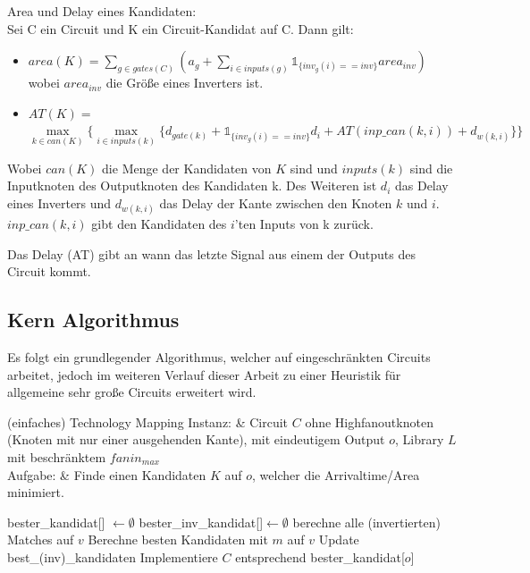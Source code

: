 \documentclass[11pt, a4paper, german]{article}
\begin{document}
\begin{definition}{Area und Delay eines Kandidaten:}\\
Sei C ein Circuit und K ein Circuit-Kandidat auf C. Dann gilt: \\
\begin{itemize}
\item $area(K) = \sum_{g \in gates(C)} (a_g + \sum_{i \in inputs(g)} \mathbb{1}_{\{inv_g(i)==inv\}} area_{inv})$ \\
wobei $area_{inv}$ die Größe eines Inverters ist.
\item $AT(K) = $\\$  \max\limits_{k \in can(K)} \{\max\limits_{i \in inputs(k)} \{   d_{gate(k)} + \mathbb{1}_{\{inv_g(i)==inv\}} d_{i} + AT(inp\_can(k,i)) + d_{w(k,i)} \} \}$ 
\end{itemize}
Wobei $can(K)$ die Menge der Kandidaten von $K$ sind und $inputs(k)$ sind die Inputknoten des Outputknoten des Kandidaten k. Des Weiteren ist $d_i$ das Delay eines Inverters und $d_{w(k,i)} $ das Delay der Kante zwischen den Knoten $k$ und $i$. $inp\_can(k,i)$ gibt den Kandidaten des $i$'ten Inputs von k zurück. 

\end{definition}

Das Delay (AT) gibt an wann das letzte Signal aus einem der Outputs des Circuit kommt.

\subsection{Kern Algorithmus}

Es folgt ein grundlegender Algorithmus, welcher auf eingeschränkten Circuits arbeitet, jedoch im weiteren Verlauf dieser Arbeit zu einer Heuristik für allgemeine sehr große Circuits erweitert wird.

\begin{problem}[framed]{(einfaches) Technology Mapping}
  Instanz:  & Circuit $C$ ohne Highfanoutknoten (Knoten mit nur einer ausgehenden Kante), mit eindeutigem Output $o$, Library $L$ mit beschr\"anktem $fanin_{max}$\\
  Aufgabe: &  Finde einen Kandidaten $K$ auf $o$, welcher die Arrivaltime/Area minimiert.
\end{problem}

\begin{algorithm}[H]
 \LinesNumbered
 \DontPrintSemicolon
 \caption{(einfaches) Technology Mapping}

 bester\_kandidat[] $\gets \emptyset$\;
 bester\_inv\_kandidat[]$ \gets \emptyset$\;
 {
   berechne alle (invertierten) Matches auf $v$\;
   {
      Berechne besten Kandidaten mit $m$ auf $v$\;
      Update best\_(inv)\_kandidaten\;
   }
 }
 Implementiere $C$ entsprechend bester\_kandidat[$o$]\;
\end{algorithm}\ \\
\end{document}
